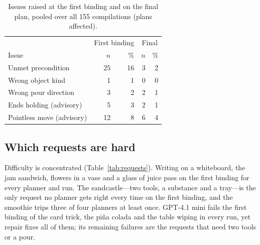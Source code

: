 \documentclass[10pt,twocolumn,letterpaper]{article}
\begin{document}
\begin{table}[t]
\centering\small
\caption{Issues raised at the first binding and on the final plan, pooled over all 155 compilations (plans affected).}
\label{tab:issues}
\begin{tabular}{@{}lrrrr@{}}
\toprule
& \multicolumn{2}{c}{First binding} & \multicolumn{2}{c}{Final}\\
Issue & $n$ & \% & $n$ & \%\\
\midrule
Unmet precondition & 25 & 16 & 3 & 2\\
Wrong object kind & 1 & 1 & 0 & 0\\
Wrong pour direction & 3 & 2 & 2 & 1\\
Ends holding (advisory) & 5 & 3 & 2 & 1\\
Pointless move (advisory) & 12 & 8 & 6 & 4\\
\bottomrule
\end{tabular}
\end{table}

\subsection{Which requests are hard}
Difficulty is concentrated (Table~\ref{tab:requests}). Writing on a whiteboard, the jam sandwich, flowers in a vase and
a glass of juice pass on the first binding for every planner and run. The sandcastle---two tools, a substance and a
tray---is the only request no planner gets right every time on the first binding, and the smoothie trips three of four
planners at least once. GPT-4.1 mini fails the first binding of the card trick, the piña colada and the table wiping
in every run, yet repair fixes all of them; its remaining failures are the requests that need two tools or a pour.
\end{document}
